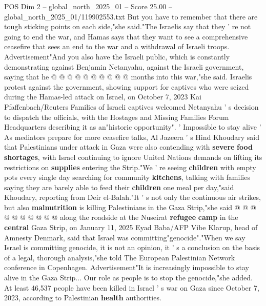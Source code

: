 \begin{textsample}{POS Dim 2 – global\_north\_2025\_01 – Score 25.00 – global\_north\_2025\_01/119902553.txt}
But you have to remember that there are tough sticking points on each side,"she said."The Israelis say that they ' re not going to end the war, and Hamas says that they want to see a comprehensive ceasefire that sees an end to the war and a withdrawal of Israeli troops.
Advertisement"And you also have the Israeli public, which is constantly demonstrating against Benjamin Netanyahu, against the Israeli government, saying that he @ @ @ @ @ @ @ @ @ @ months into this war,"she said.
Israelis protest against the government, showing support for captives who were seized during the Hamas-led attack on Israel, on October 7, 2023 Kai Pfaffenbach/Reuters Families of Israeli captives welcomed Netanyahu ' s decision to dispatch the officials, with the Hostages and Missing Families Forum Headquarters describing it as an"historic opportunity". ' Impossible to stay alive ' As mediators prepare for more ceasefire talks, Al Jazeera ' s Hind Khoudary said that Palestinians under attack in Gaza were also contending with \textbf{severe} \textbf{food} \textbf{shortages}, with Israel continuing to ignore United Nations demands on lifting its restrictions on \textbf{supplies} entering the Strip."We ' re seeing \textbf{children} with empty pots every single day searching for community \textbf{kitchens}, talking with families saying they are barely able to feed their \textbf{children} one meal per day,"said Khoudary, reporting from Deir el-Balah."It ' s not only the continuous air strikes, but also \textbf{malnutrition} is killing Palestinians in the Gaza Strip,"she said @ @ @ @ @ @ @ @ @ @ along the roadside at the Nuseirat \textbf{refugee} \textbf{camp} in the \textbf{central} Gaza Strip, on January 11, 2025 Eyad Baba/AFP Vibe Klarup, head of Amnesty Denmark, said that Israel was committing"genocide"."When we say Israel is committing genocide, it is not an opinion, it ' s a conclusion on the basis of a legal, thorough analysis,"she told The European Palestinian Network conference in Copenhagen.
Advertisement"It is increasingly impossible to stay alive in the Gaza Strip...
Our role as people is to stop the genocide,"she added.
At least 46,537 people have been killed in Israel ' s war on Gaza since October 7, 2023, according to Palestinian \textbf{health} authorities.

\end{textsample}
